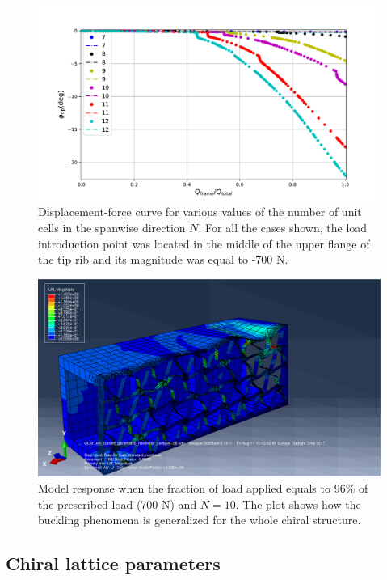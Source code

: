     \begin{figure}[!htpb] %
      \centering
      \includegraphics[width=0.8 \textwidth]{../figures/result-sim/N/force_displacement-far}
      \caption[Displacement-force curve for various values of the number of unit cells in the spanwise direction]{Displacement-force curve for various values of the number of unit cells in the spanwise direction $N$. For all the cases shown, the load introduction point was located in the middle of the upper flange of the tip rib and its magnitude was equal to -700 N.}\label{fig:forceDisplacement-far-N}
    \end{figure}

    \begin{figure}[!htpb] %
      \centering
      \includegraphics[width=0.8 \textwidth]{../figures/result-sim/N/10}
      \caption[Model response when the fraction of load applied equals to 96\% of the prescribed load (700 N) and $N = 10$]{Model response when the fraction of load applied equals to 96\% of the prescribed load (700 N) and $N = 10$. The plot shows how the buckling phenomena is generalized for the whole chiral structure.}\label{fig:N10-UR}
    \end{figure}

  \clearpage
  \subsection{Chiral lattice parameters} \label{subsec:chiral_para}

